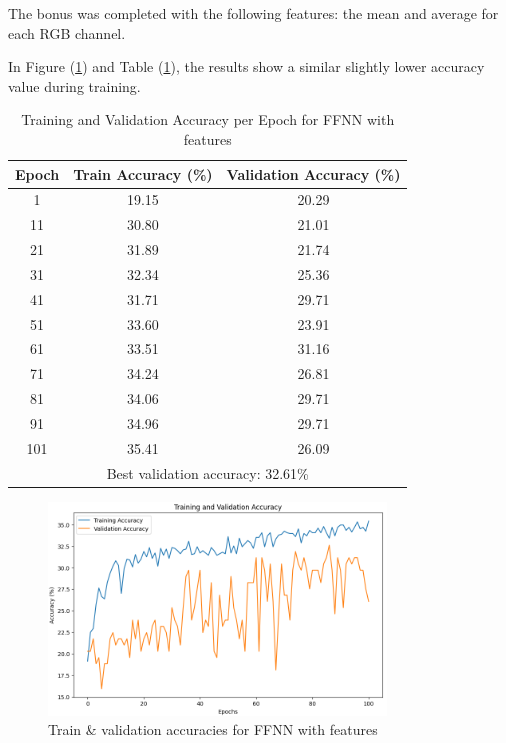 \documentclass[11pt]{scrartcl}
\begin{document}
The bonus was completed with the following features:
the mean and average for each RGB channel.

In Figure (\ref{fig:task1-bonus-accuracy}) 
and Table (\ref{tab:task1-bonus-accuracy}), 
the results show a similar slightly lower accuracy value during training.

\begin{table}[htbp]
\centering
\caption{Training and Validation Accuracy per Epoch for FFNN with features}
\begin{tabular}{ccc}
\toprule
\textbf{Epoch} & \textbf{Train Accuracy (\%)} & \textbf{Validation Accuracy (\%)} \\
\midrule
1    & 19.15  & 20.29  \\
11   & 30.80  & 21.01  \\
21   & 31.89  & 21.74  \\
31   & 32.34  & 25.36  \\
41   & 31.71  & 29.71  \\
51   & 33.60  & 23.91  \\
61   & 33.51  & 31.16  \\
71   & 34.24  & 26.81  \\
81   & 34.06  & 29.71  \\
91   & 34.96  & 29.71  \\
101  & 35.41  & 26.09  \\
\midrule
\multicolumn{3}{c}{Best validation accuracy: 32.61\%} \\
\bottomrule
\end{tabular}
\label{tab:task1-bonus-accuracy}
\end{table}

\begin{figure}[htbp]
\centering
\includegraphics[width=0.8\textwidth]{./figures/task1-bonus-accuracy.png}
\caption{Train \& validation accuracies for FFNN with features}
\label{fig:task1-bonus-accuracy}
\end{figure}
\end{document}
